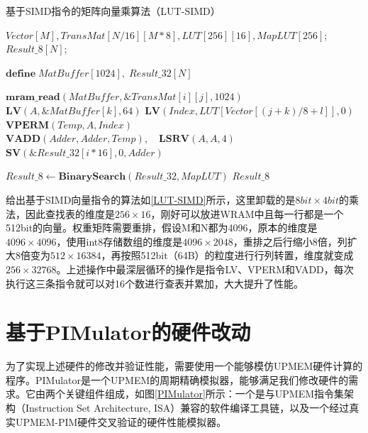 \begin{algorithm}[!htbp]
    \caption{基于SIMD指令的矩阵向量乘算法（LUT-SIMD）}
    \label{LUT-SIMD}
    \begin{algorithmic}[1]
        \Require $Vector[M], TransMat[N/16][M*8], LUT[256][16], MapLUT[256]$; %
        \Ensure $Result\_8[N]$; %

        \State $\textbf{define}\;MatBuffer[1024],\;Result\_32[N]$

                \State $\textbf{mram\_read}(MatBuffer, \&TransMat[i][j], 1024)$
                    \State $\textbf{LV}(A, \&MatBuffer[k], 64)$
                        \State $\textbf{LV}(Index, LUT[Vector[(j + k) / 8 + l]], 0)$
                        \State $\textbf{VPERM}(Temp, A, Index)$
                        \State $\textbf{VADD}(Adder, Adder, Temp),\quad \textbf{LSRV}(A, A, 4)$
                    \EndFor
                \EndFor
            \EndFor
            \State $\textbf{SV}(\&Result\_32[i*16], 0, Adder)$
        \EndFor

        \State $Result\_8 \gets \textbf{BinarySearch}(Result\_32, MapLUT)$
        \Comment{\textcolor{blue}{parallel in N for each tasklet}}
        \State \Return $Result\_8$
    \end{algorithmic}
\end{algorithm}

给出基于SIMD向量指令的算法如\ref{LUT-SIMD}所示，这里卸载的是$8bit\times 4bit$的乘法，因此查找表的维度是$256\times 16$，刚好可以放进WRAM中且每一行都是一个512bit的向量。权重矩阵需要重排，假设M和N都为4096，原本的维度是$4096\times 4096$，使用int8存储数组的维度是$4096\times 2048$，重排之后行缩小8倍，列扩大8倍变为$512\times 16384$，再按照512bit（64B）的粒度进行行列转置，维度就变成$256\times 32768$。上述操作中最深层循环的操作是指令LV、VPERM和VADD，每次执行这三条指令就可以对16个数进行查表并累加，大大提升了性能。

\section{基于PIMulator的硬件改动}
为了实现上述硬件的修改并验证性能，需要使用一个能够模仿UPMEM硬件计算的程序。PIMulator是一个UPMEM的周期精确模拟器\cite{uPimulator}，能够满足我们修改硬件的需求。它由两个关键组件组成，如图\ref{PIMulator}所示：一个是与UPMEM指令集架构（Instruction Set Architecture, ISA）兼容的软件编译工具链，以及一个经过真实UPMEM-PIM硬件交叉验证的硬件性能模拟器。

